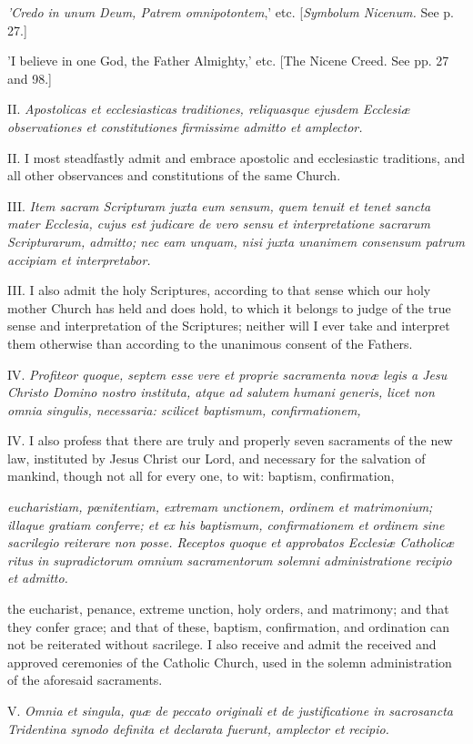 \emph{'Credo in unum Deum, Patrem omnipotontem},' etc. [\emph{Symbolum Nicenum.} See p. 27.]

'I believe in one God, the Father Almighty,' etc. [The Nicene Creed. See pp. 27 and 98.]

II. \emph{Apostolicas et ecclesiasticas traditiones, reliquasque ejusdem Ecclesiæ observationes et constitutiones firmissime admitto et amplector.}

II. I most steadfastly admit and embrace apostolic and ecclesiastic traditions, and all other observances and constitutions of the same Church.

III. \emph{Item sacram Scripturam juxta eum sensum, quem tenuit et tenet sancta mater Ecclesia, cujus est judicare de vero sensu et interpretatione sacrarum Scripturarum, admitto; nec eam unquam, nisi juxta unanimem consensum patrum accipiam et interpretabor.}

III. I also admit the holy Scriptures, according to that sense which our holy mother Church has held and does hold, to which it belongs to judge of the true sense and interpretation of the Scriptures; neither will I ever take and interpret them otherwise than according to the unanimous consent of the Fathers.

IV. \emph{Profiteor quoque, septem esse vere et proprie sacramenta novæ legis a Jesu Christo Domino nostro instituta, atque ad salutem humani generis, licet non omnia singulis, necessaria: scilicet baptismum, confirmationem, }

IV. I also profess that there are truly and properly seven sacraments of the new law, instituted by Jesus Christ our Lord, and necessary for the salvation of mankind, though not all for every one, to wit: baptism, confirmation,

\emph{eucharistiam, pœnitentiam, extremam unctionem, ordinem et matrimonium; illaque gratiam conferre; et ex his baptismum, confirmationem et ordinem sine sacrilegio reiterare non posse. Receptos quoque et approbatos Ecclesiæ Catholicæ ritus in supradictorum omnium sacramentorum solemni administratione recipio et admitto.}

the eucharist, penance, extreme unction, holy orders, and matrimony; and that they confer grace; and that of these, baptism, confirmation, and ordination can not be reiterated without sacrilege. I also receive and admit the received and approved ceremonies of the Catholic Church, used in the solemn administration of the aforesaid sacraments.

V. \emph{Omnia et singula, quæ de peccato originali et de justificatione in sacrosancta Tridentina synodo definita et declarata fuerunt, amplector et recipio.}

